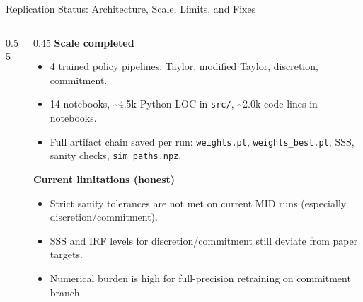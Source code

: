 \documentclass[aspectratio=169]{beamer}
\begin{document}
\begin{frame}{Replication Status: Architecture, Scale, Limits, and Fixes}
\begin{columns}[T,totalwidth=\textwidth]
\begin{column}{0.55\textwidth}
\centering
{}
\end{column}

\begin{column}{0.45\textwidth}
\footnotesize
\textbf{Scale completed}
\begin{itemize}
  \item 4 trained policy pipelines: Taylor, modified Taylor, discretion, commitment.
  \item 14 notebooks, \textasciitilde 4.5k Python LOC in \texttt{src/}, \textasciitilde 2.0k code lines in notebooks.
  \item Full artifact chain saved per run: \texttt{weights.pt}, \texttt{weights\_best.pt}, SSS, sanity checks, \texttt{sim\_paths.npz}.
\end{itemize}

\textbf{Current limitations (honest)}
\begin{itemize}
  \item Strict sanity tolerances are not met on current MID runs (especially discretion/commitment).
  \item SSS and IRF levels for discretion/commitment still deviate from paper targets.
  \item Numerical burden is high for full-precision retraining on commitment branch.
\end{itemize}


\end{column}
\end{columns}
\end{frame}
\end{document}
